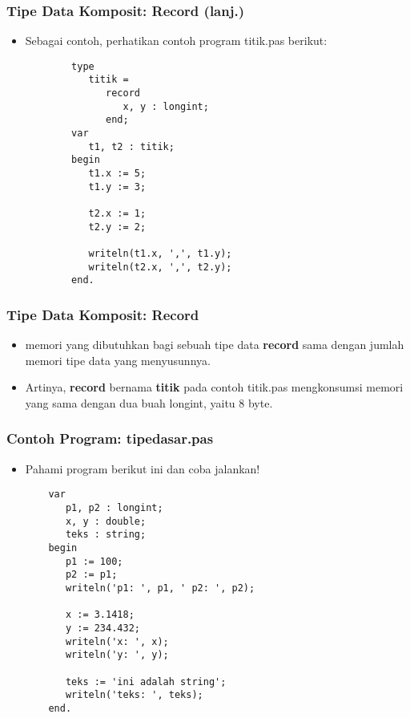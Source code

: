\documentclass{beamer}
\begin{document}
\begin{frame}[fragile]
\frametitle{Tipe Data Komposit: Record (lanj.)}
\begin{itemize}
    \item Sebagai contoh, perhatikan contoh program titik.pas berikut:
    \begin{lstlisting}
        type
           titik =
              record
                 x, y : longint;
              end;
        var
           t1, t2 : titik;
        begin
           t1.x := 5;
           t1.y := 3;

           t2.x := 1;
           t2.y := 2;

           writeln(t1.x, ',', t1.y);
           writeln(t2.x, ',', t2.y);
        end.
    \end{lstlisting}
\end{itemize}
\end{frame}

\begin{frame}
\frametitle{Tipe Data Komposit: Record}
\begin{itemize}
    \item memori yang dibutuhkan bagi sebuah tipe data \textbf{record} sama dengan jumlah memori tipe data yang menyusunnya.
    \item Artinya, \textbf{record} bernama \textbf{titik} pada contoh titik.pas mengkonsumsi memori yang sama dengan dua buah longint, yaitu 8 byte.
\end{itemize}
\end{frame}

\begin{frame}[fragile]
\frametitle{Contoh Program: tipedasar.pas}
\begin{itemize}
    \item Pahami program berikut ini dan coba jalankan!
    \begin{lstlisting}
    var
       p1, p2 : longint;
       x, y : double;
       teks : string;
    begin
       p1 := 100;
       p2 := p1;
       writeln('p1: ', p1, ' p2: ', p2);

       x := 3.1418;
       y := 234.432;
       writeln('x: ', x);
       writeln('y: ', y);

       teks := 'ini adalah string';
       writeln('teks: ', teks);
    end.
    \end{lstlisting}
\end{itemize}
\end{frame}
\end{document}
